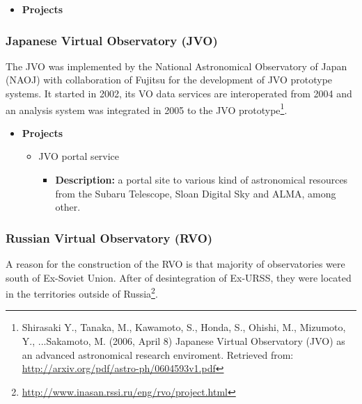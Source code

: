 \begin{itemize}
\item \textbf{Projects}
\end{itemize}

\subsubsection{Japanese Virtual Observatory (JVO)}
The JVO was implemented by the National Astronomical Observatory of Japan (NAOJ)
with collaboration of Fujitsu for the development of JVO prototype systems. It
started in 2002, its VO data services are interoperated from 2004 and an
analysis system was integrated in 2005 to the JVO prototype\footnote{Shirasaki
Y., Tanaka, M., Kawamoto, S., Honda, S., Ohishi, M., Mizumoto, Y., ...Sakamoto,
M. (2006, April 8) Japanese Virtual Observatory (JVO) as an advanced
astronomical research enviroment. Retrieved from:
\url{http://arxiv.org/pdf/astro-ph/0604593v1.pdf}}.

\begin{itemize}
\item \textbf{Projects}
\begin{itemize}
\item JVO portal service
\begin{itemize}
\item \textbf{Description:} a portal site to various kind of astronomical
resources from the Subaru Telescope, Sloan Digital Sky and ALMA, among other.
\end{itemize}
\end{itemize}
\end{itemize}

\subsubsection{Russian Virtual Observatory (RVO)}
A reason for the construction of the RVO is that majority of observatories were
south of Ex-Soviet Union. After of desintegration of Ex-URSS, they were located
in the territories outside of
Russia\footnote{\url{http://www.inasan.rssi.ru/eng/rvo/project.html}}.

